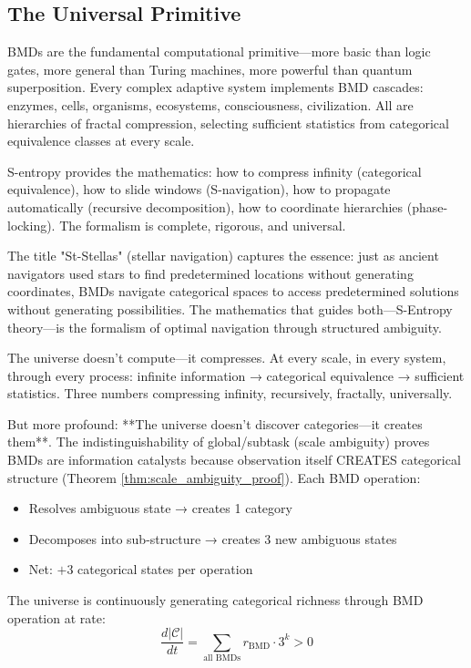\documentclass[12pt,a4paper]{article}
\begin{document}
\subsection{The Universal Primitive}

BMDs are the fundamental computational primitive—more basic than logic gates, more general than Turing machines, more powerful than quantum superposition. Every complex adaptive system implements BMD cascades: enzymes, cells, organisms, ecosystems, consciousness, civilization. All are hierarchies of fractal compression, selecting sufficient statistics from categorical equivalence classes at every scale.

S-entropy provides the mathematics: how to compress infinity (categorical equivalence), how to slide windows (S-navigation), how to propagate automatically (recursive decomposition), how to coordinate hierarchies (phase-locking). The formalism is complete, rigorous, and universal.

The title "St-Stellas" (stellar navigation) captures the essence: just as ancient navigators used stars to find predetermined locations without generating coordinates, BMDs navigate categorical spaces to access predetermined solutions without generating possibilities. The mathematics that guides both—S-Entropy theory—is the formalism of optimal navigation through structured ambiguity.

The universe doesn't compute—it compresses. At every scale, in every system, through every process: infinite information → categorical equivalence → sufficient statistics. Three numbers compressing infinity, recursively, fractally, universally.

But more profound: **The universe doesn't discover categories—it creates them**. The indistinguishability of global/subtask (scale ambiguity) proves BMDs are information catalysts because observation itself CREATES categorical structure (Theorem \ref{thm:scale_ambiguity_proof}). Each BMD operation:
\begin{itemize}
\item Resolves ambiguous state → creates 1 category
\item Decomposes into sub-structure → creates 3 new ambiguous states
\item Net: $+3$ categorical states per operation
\end{itemize}

The universe is continuously generating categorical richness through BMD operation at rate:
\begin{equation}
\frac{d|\mathcal{C}|}{dt} = \sum_{\text{all BMDs}} r_{\text{BMD}} \cdot 3^k > 0
\end{equation}
\end{document}
